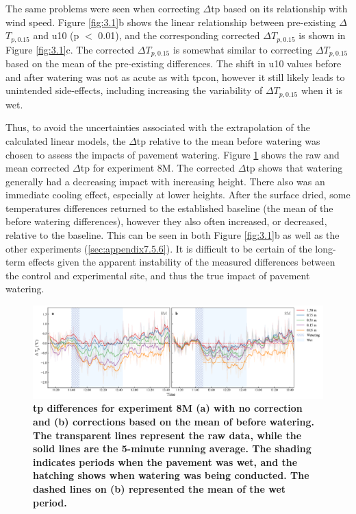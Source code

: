 \documentclass[final,3p,times,authoryear]{elsarticle}
\begin{document}
The same problems were seen when correcting $\Delta$\gls{tp} based on its relationship with wind speed. Figure \ref{fig:3.1}b shows the linear relationship between pre-existing $\Delta$$T_{p,0.15}$ and \gls{u10} (\gls{p} $<$ 0.01), and the corresponding corrected $\Delta$$T_{p,0.15}$ is shown in Figure \ref{fig:3.1}c. The corrected $\Delta$$T_{p,0.15}$ is somewhat similar to correcting $\Delta$$T_{p,0.15}$ based on the mean of the pre-existing differences. The shift in \gls{u10} values before and after watering was not as acute as with \gls{tpcon}, however it still likely leads to unintended side-effects, including increasing the variability of $\Delta$$T_{p,0.15}$ when it is wet.

Thus, to avoid the uncertainties associated with the extrapolation of the calculated linear
models, the $\Delta$\gls{tp} relative to the mean before watering was chosen to assess the impacts of pavement watering. Figure \ref{fig:3.2} shows the raw and mean corrected $\Delta$\gls{tp} for experiment 8M. The corrected $\Delta$\gls{tp} shows that watering generally had a decreasing impact with increasing height. There also was an immediate cooling effect, especially at lower heights. After the surface dried, some temperatures differences returned to the established baseline (the mean of the before watering differences), however they also often increased, or decreased, relative to the baseline. This can be seen in both Figure \ref{fig:3.1}b as well as the other experiments (\ref{sec:appendix7.5.6}). It is difficult to be certain of the long-term effects given the apparent instability of the measured differences between the control and experimental site, and thus the true impact of pavement watering.

\begin{figure}
\centering
\includegraphics[trim={0 0 0 0},clip,scale=1.0]{pict013.png}
\caption{\bf \gls{tp} differences for experiment 8M (a) with no correction and (b) corrections based on the mean of before watering. The transparent lines represent the raw data, while the solid lines are the 5-minute running average. The shading indicates periods when the pavement was wet, and the hatching shows when watering was being conducted. The dashed lines on (b) represented the mean of the wet period.}
 \label{fig:3.2}
\end{figure}
\end{document}
